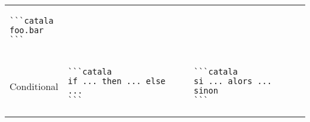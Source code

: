 \documentclass[a3paper,landscape]{article}
\begin{document}
\begin{multicols*}{2}
\begin{center}
\begin{tabular}{p{}p{}p{}}
      \vspace*{-1.75em}
      \begin{verbatim}
```catala
foo.bar
```
\end{verbatim}
      \vspace*{-1.75em}
      \\
      Conditional                       &
      \vspace*{-1.75em}
      \begin{verbatim}
```catala
if ... then ... else ...
```
\end{verbatim}
      \vspace*{-1.75em}
                                        &
      \vspace*{-1.75em}
      \begin{verbatim}
```catala
si ... alors ... sinon
```
\end{verbatim}
      \vspace*{-1.75em}
      \\
      \bottomrule
    \end{tabular}
  \end{center}


\end{multicols*}
\end{document}
